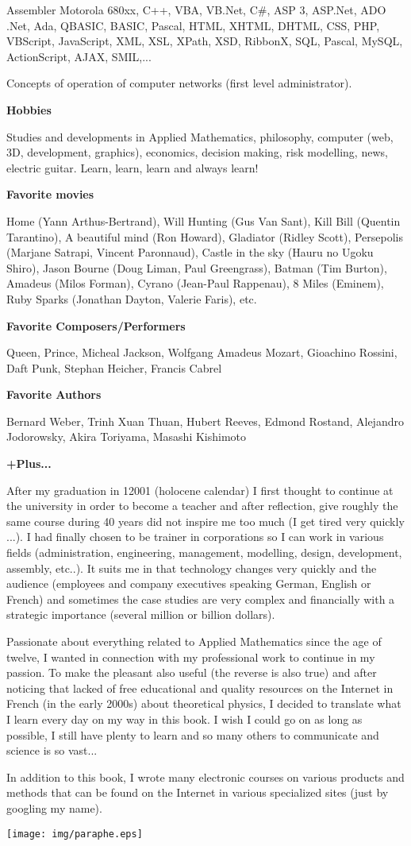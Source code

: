 Assembler Motorola 680xx, C++, VBA, VB.Net, C\#, ASP 3, ASP.Net, ADO .Net, Ada, QBASIC, BASIC, Pascal, HTML, XHTML, DHTML, CSS, PHP, VBScript, JavaScript, XML, XSL, XPath, XSD, RibbonX, SQL, Pascal, MySQL, ActionScript, AJAX, SMIL,...

Concepts of operation of computer networks (first level administrator).

\textbf{Hobbies}

Studies and developments in Applied Mathematics, philosophy, computer (web, 3D, development, graphics), economics, decision making, risk modelling, news, electric guitar. Learn, learn, learn and always learn!

\textbf{Favorite movies}

Home (Yann Arthus-Bertrand), Will Hunting (Gus Van Sant), Kill Bill (Quentin Tarantino), A beautiful mind (Ron Howard), Gladiator (Ridley Scott), Persepolis (Marjane Satrapi, Vincent Paronnaud), Castle in the sky (Hauru no Ugoku Shiro), Jason Bourne (Doug Liman, Paul Greengrass), Batman (Tim Burton), Amadeus (Milos Forman), Cyrano (Jean-Paul Rappenau), 8 Miles (Eminem), Ruby Sparks (Jonathan Dayton, Valerie Faris), etc.

\textbf{Favorite Composers/Performers}

Queen, Prince, Micheal Jackson, Wolfgang Amadeus Mozart, Gioachino Rossini, Daft Punk, Stephan Heicher, Francis Cabrel

\textbf{Favorite Authors}

Bernard Weber, Trinh Xuan Thuan, Hubert Reeves, Edmond Rostand, Alejandro Jodorowsky, Akira Toriyama, Masashi Kishimoto

\textbf{+Plus...}

	After my graduation in 12001 (holocene calendar) I first thought to continue at the university in order to become a teacher and after reflection, give roughly the same course during 40 years did not inspire me too much (I get tired very quickly ...). I had finally chosen to be trainer in corporations so I can work in various fields (administration, engineering, management, modelling, design, development, assembly, etc..). It suits me in that technology changes very quickly and the audience (employees and company executives speaking German, English or French) and sometimes the case studies are very complex and financially with a strategic importance (several million or billion dollars).

	Passionate about everything related to Applied Mathematics since the age of twelve, I wanted in connection with my professional work to continue in my passion. To make the pleasant also useful (the reverse is also true) and after noticing that lacked of free educational and quality resources on the Internet in French (in the early 2000s) about theoretical physics, I decided to translate what I learn every day on my way in this book. I wish I could go on as long as possible, I still have plenty to learn and so many others to communicate and science is so vast...

In addition to this book, I wrote many electronic courses on various products and methods that can be found on the Internet in various specialized sites (just by googling my name).
\begin{flushright}
\texttt{[image: img/paraphe.eps]}
\end{flushright}
